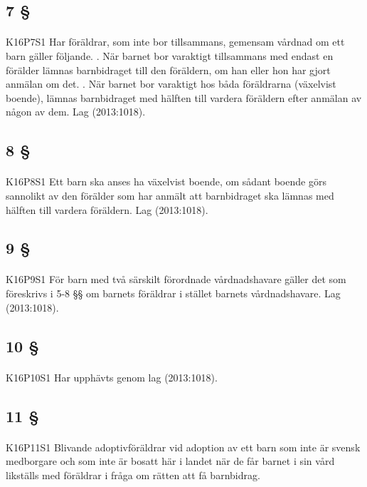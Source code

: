 \documentclass[a4paper,notitlepage,openany,10pt]{book}
\begin{document}
\subsection*{7 §}
\paragraph*{}
{\tiny K16P7S1}
Har föräldrar, som inte bor tillsammans, gemensam vårdnad om ett barn gäller följande.
. När barnet bor varaktigt tillsammans med endast en förälder lämnas barnbidraget till den föräldern, om han eller hon har gjort anmälan om det.
. När barnet bor varaktigt hos båda föräldrarna (växelvist boende), lämnas barnbidraget med hälften till vardera föräldern efter anmälan av någon av dem.
Lag (2013:1018).
\subsection*{8 §}
\paragraph*{}
{\tiny K16P8S1}
Ett barn ska anses ha växelvist boende, om sådant boende görs sannolikt av den förälder som har anmält att barnbidraget ska lämnas med hälften till vardera föräldern.
Lag (2013:1018).
\subsection*{9 §}
\paragraph*{}
{\tiny K16P9S1}
För barn med två särskilt förordnade vårdnadshavare gäller det som föreskrivs i 5-8 §§ om barnets föräldrar i stället barnets vårdnadshavare.
Lag (2013:1018).
\subsection*{10 §}
\paragraph*{}
{\tiny K16P10S1}
Har upphävts genom
lag (2013:1018).
\subsection*{11 §}
\paragraph*{}
{\tiny K16P11S1}
Blivande adoptivföräldrar vid adoption av ett barn som inte är svensk medborgare och som inte är bosatt här i landet när de får barnet i sin vård likställs med föräldrar i fråga om rätten att få barnbidrag.
\end{document}

